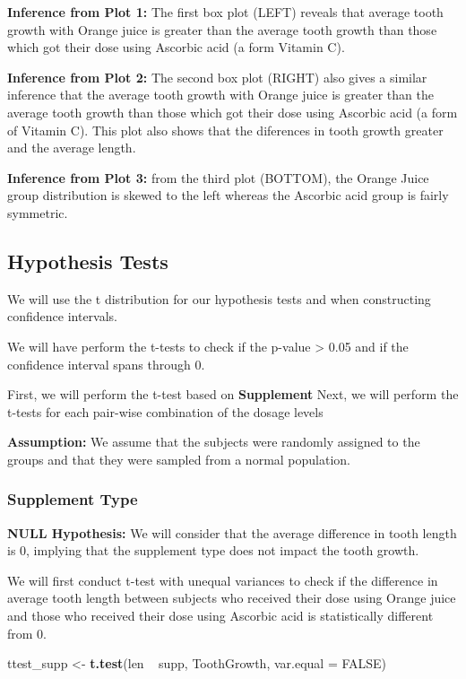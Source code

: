 \documentclass[]{article}
\newenvironment{Shaded}{\begin{snugshade}}{\end{snugshade}}
\newcommand{\KeywordTok}[1]{\textcolor[rgb]{0.13,0.29,0.53}{\textbf{{#1}}}}
\newcommand{\DataTypeTok}[1]{\textcolor[rgb]{0.13,0.29,0.53}{{#1}}}
\newcommand{\StringTok}[1]{\textcolor[rgb]{0.31,0.60,0.02}{{#1}}}
\newcommand{\OtherTok}[1]{\textcolor[rgb]{0.56,0.35,0.01}{{#1}}}
\newcommand{\NormalTok}[1]{{#1}}
\begin{document}
\textbf{Inference from Plot 1:} The first box plot (LEFT) reveals that
average tooth growth with Orange juice is greater than the average tooth
growth than those which got their dose using Ascorbic acid (a form
Vitamin C).

\textbf{Inference from Plot 2:} The second box plot (RIGHT) also gives a
similar inference that the average tooth growth with Orange juice is
greater than the average tooth growth than those which got their dose
using Ascorbic acid (a form of Vitamin C). This plot also shows that the
diferences in tooth growth greater and the average length.

\textbf{Inference from Plot 3:} from the third plot (BOTTOM), the Orange
Juice group distribution is skewed to the left whereas the Ascorbic acid
group is fairly symmetric.

\subsection{Hypothesis Tests}\label{hypothesis-tests}

We will use the t distribution for our hypothesis tests and when
constructing confidence intervals.

We will have perform the t-tests to check if the p-value \textgreater{}
0.05 and if the confidence interval spans through 0.

First, we will perform the t-test based on \textbf{Supplement} Next, we
will perform the t-tests for each pair-wise combination of the dosage
levels

\textbf{Assumption:} We assume that the subjects were randomly assigned
to the groups and that they were sampled from a normal population.

\subsubsection{Supplement Type}\label{supplement-type}

\textbf{NULL Hypothesis:} We will consider that the average difference
in tooth length is 0, implying that the supplement type does not impact
the tooth growth.

We will first conduct t-test with unequal variances to check if the
difference in average tooth length between subjects who received their
dose using Orange juice and those who received their dose using Ascorbic
acid is statistically different from 0.

\begin{Shaded}
\begin{Highlighting}[]
\NormalTok{ttest_supp <-}\StringTok{ }\KeywordTok{t.test}\NormalTok{(len ~}\StringTok{ }\NormalTok{supp, ToothGrowth, }\DataTypeTok{var.equal =} \OtherTok{FALSE}\NormalTok{)}
\end{Highlighting}
\end{Shaded}
\end{document}
